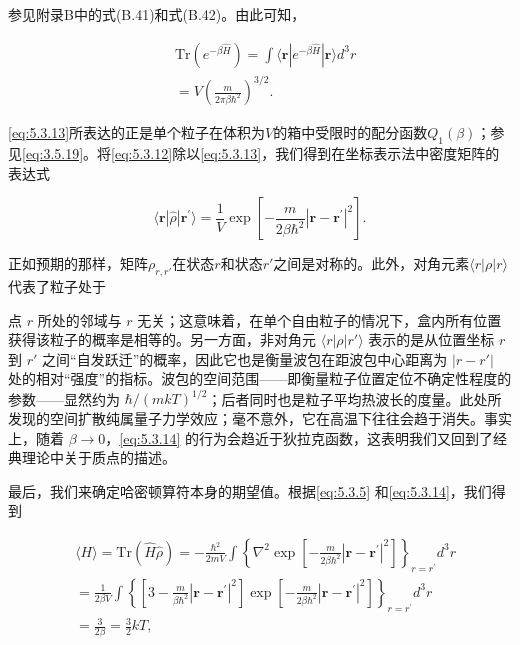 参见附录B中的式(B.41)和式(B.42)。由此可知，

\begin{equation}\tag{5.3.13}\label{eq:5.3.13}
\begin{array}{rl} & { \mathrm { T r } ( e ^{- \beta \hat { H} } ) = \int \langle \mathbf { r } | e ^{- \beta \hat { H} } | \mathbf { r } \rangle d ^{3} r } \\& {  = V \left( \frac { m } { 2 \pi \beta \hbar ^{2} } \right) ^{3 / 2} . } \end{array}
\end{equation}

\autoref{eq:5.3.13}所表达的正是单个粒子在体积为\(V\)的箱中受限时的配分函数\(Q_{1}(\beta)\)；参见\autoref{eq:3.5.19}。将\autoref{eq:5.3.12}除以\autoref{eq:5.3.13}，我们得到在坐标表示法中密度矩阵的表达式

\begin{equation}\tag{5.3.14}\label{eq:5.3.14}
\langle \pmb { r } | \hat { \rho } | \pmb { r } ^{\prime} \rangle = \frac { 1 } { V } \exp \left[ - \frac { m } { 2 \beta \hbar ^{2} } | \pmb { r } - \pmb { r } ^{\prime} | ^{2} \right] .
\end{equation}

正如预期的那样，矩阵\(\rho_{r,r'}\)在状态\(r\)和状态\(r'\)之间是对称的。此外，对角元素\(\langle r|\rho|r\rangle\)代表了粒子处于

点 \(r\) 所处的邻域与 \(r\) 无关；这意味着，在单个自由粒子的情况下，盒内所有位置获得该粒子的概率是相等的。另一方面，非对角元 \(\langle r|\rho|r'\rangle\) 表示的是从位置坐标 \(r\) 到 \(r'\) 之间``自发跃迁''的概率，因此它也是衡量波包在距波包中心距离为 \(|r-r'|\) 处的相对``强度''的指标。波包的空间范围------即衡量粒子位置定位不确定性程度的参数------显然约为 \(\hbar/(mkT)^{1/2}\)；后者同时也是粒子平均热波长的度量。此处所发现的空间扩散纯属量子力学效应；毫不意外，它在高温下往往会趋于消失。事实上，随着 \(\beta\to0\)，\autoref{eq:5.3.14} 的行为会趋近于狄拉克函数，这表明我们又回到了经典理论中关于质点的描述。

最后，我们来确定哈密顿算符本身的期望值。根据\autoref{eq:5.3.5} 和\autoref{eq:5.3.14}，我们得到

\begin{equation}\tag{5.3.15}\label{eq:5.3.15}
\begin{array}{rl} & { \langle H \rangle = \mathrm { T r } ( \hat { H } \hat { \rho } ) = - \frac { \hbar ^{2} } { 2 m V } \int \left\{ \nabla ^{2} \exp \left[ - \frac { m } { 2 \beta \hbar ^{2} } | \boldsymbol { r } - \boldsymbol { r } ^{\prime} | ^{2} \right] \right\} _ { r = r ^{\prime} } d ^{3} r } \\& { = \frac { 1 } { 2 \beta V } \int \left\{ \left[ 3 - \frac { m } { \beta \hbar ^{2} } | \boldsymbol { r } - \boldsymbol { r } ^{\prime} | ^{2} \right] \exp \left[ - \frac { m } { 2 \beta \hbar ^{2} } | \boldsymbol { r } - \boldsymbol { r } ^{\prime} | ^{2} \right] \right\} _ { r = r ^{\prime} } d ^{3} r } \\& { = \frac { 3 } { 2 \beta } = \frac { 3 } { 2 } k T , } \end{array}
\end{equation}

